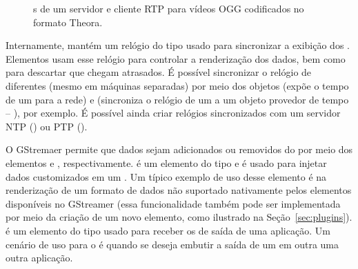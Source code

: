 \begin{figure}[H]
  \centering
  \caption{s de um servidor e cliente RTP para vídeos 
    OGG codificados no formato Theora.}
  \label{fig:pipe-rtp-server}
\end{figure}

Internamente,  mantém um relógio do tipo  usado
para sincronizar a exibição dos . Elementos  usam esse
relógio para controlar a renderização dos dados, bem como para descartar
 que chegam atrasados. É possível sincronizar o relógio de 
 diferentes (mesmo em máquinas separadas) por meio dos objetos
 (expõe o tempo de um  para a rede) 
e  (sincroniza o relógio de um  a um
objeto provedor de tempo -- ), por exemplo. É possível
ainda criar relógios sincronizados com um servidor NTP () 
ou PTP ().

O GStremaer permite que dados sejam adicionados ou removidos do 
por meio dos elementos  e , respectivamente. 
é um elemento do tipo  e é usado para injetar dados customizados em
um . Um típico exemplo de uso desse elemento é na renderização
de um formato de dados não suportado nativamente pelos elementos disponíveis
no GStreamer (essa funcionalidade também pode ser implementada por meio da
criação de um novo elemento, como ilustrado na Seção~\ref{sec:plugins}).
 é um elemento do tipo  usado para receber os 
de saída de uma aplicação. Um cenário de uso para o  é quando se
deseja embutir a saída de um  em outra uma outra aplicação.


